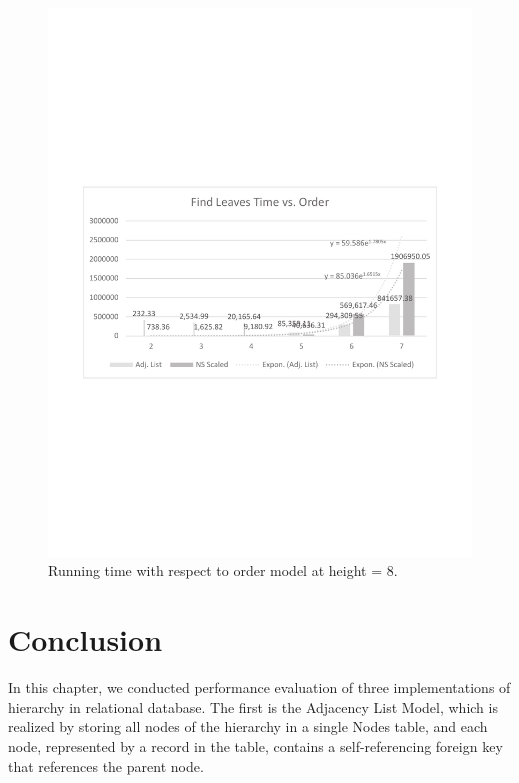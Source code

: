 \begin{figure}[!h]
\begin{center}
\includegraphics[width=6in]{images/eval/leaves/order/col_trend.pdf}
\caption{Running time with respect to order model at height = 8.\label{fig-leaves-order2}}
\end{center}
\end{figure}

\section{Conclusion}\label{sec_conclusion}

In this chapter, we conducted performance evaluation of three implementations of hierarchy in relational database. The first is the Adjacency List Model, which is realized by storing all nodes of the hierarchy in a single Nodes table, and each node, represented by a record in the table, contains a self-referencing foreign key that references the parent node.

